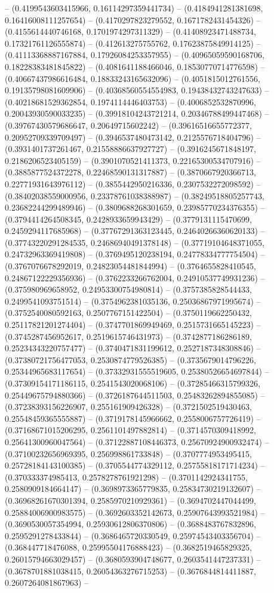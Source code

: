 -- (0.4199543603415966, 0.16114297359441734) -- (0.4184941281381698, 0.16416008111257654) -- (0.4170297823279552, 0.1671782431454326) -- (0.4155614440746168, 0.1701974297311329) -- (0.41408923471488734, 0.17321761126555874) -- (0.412613275755762, 0.17623875849914125) -- (0.41113368887167884, 0.17926084253357955) -- (0.40965059590168706, 0.18228383481845822) -- (0.4081641188466046, 0.18530770714776598) -- (0.40667437986616484, 0.18833243165632096) -- (0.4051815012761556, 0.19135798081609906) -- (0.40368560554554983, 0.19438432743247633) -- (0.40218681529362854, 0.1974114446403753) -- (0.4006852532870996, 0.20043930590033235) -- (0.39918104243721214, 0.20346788499447468) -- (0.39767430579686647, 0.20649715602242) -- (0.39616516655772377, 0.20952709339709497) -- (0.3946537480473142, 0.2125576718404796) -- (0.3931401737261467, 0.21558886637927727) -- (0.3916245671848197, 0.2186206523405159) -- (0.3901070521411373, 0.22165300534707916) -- (0.3885877524372278, 0.22468590131317887) -- (0.3870667920366713, 0.22771931643976112) -- (0.3855442950216336, 0.2307532272098592) -- (0.38402038559000956, 0.23378761038388987) -- (0.38249518805257743, 0.23682244299489946) -- (0.3809688268301659, 0.23985770234376355) -- (0.3794414264508345, 0.2428933659943429) -- (0.3779131115470699, 0.2459294117685968) -- (0.37767291363123445, 0.24640266360620133) -- (0.37743220291284535, 0.24686940491378148) -- (0.37719104648371055, 0.24732963369419808) -- (0.3769495120238194, 0.24778334777754504) -- (0.3767076678292019, 0.24823054481844994) -- (0.3764655828410545, 0.24867122229356936) -- (0.3762233266762004, 0.24910537749931236) -- (0.375980969658952, 0.24953300754980814) -- (0.3757385828544433, 0.2499541093751514) -- (0.3754962381035136, 0.25036867971995674) -- (0.3752540080592163, 0.2507767151422504) -- (0.3750119662250432, 0.25117821201274404) -- (0.3747701869949469, 0.2515731665145223) -- (0.3745287456952617, 0.2519615746431973) -- (0.3742877186286189, 0.25234343220757477) -- (0.3740471831199612, 0.2527187348308846) -- (0.37380721756477053, 0.2530874779526385) -- (0.3735679014796226, 0.25344965683117654) -- (0.37332931555519605, 0.25380526654697844) -- (0.37309154171186115, 0.2541543020068106) -- (0.37285466315799326, 0.25449675794880366) -- (0.3726187644511503, 0.25483262894855085) -- (0.37238393156226907, 0.255161909426328) -- (0.3721502519430463, 0.25548459365555887) -- (0.3719178145966662, 0.2558006757726419) -- (0.37168671015206295, 0.2561101497882814) -- (0.3714570309418992, 0.25641300960047564) -- (0.37122887108446373, 0.25670924900932474) -- (0.37100232656969395, 0.256998861733848) -- (0.3707774953495415, 0.25728184143100385) -- (0.3705544774329112, 0.25755818171714234) -- (0.370333374985413, 0.2578278761921298) -- (0.3701142924341755, 0.2580909184664147) -- (0.3698973365779835, 0.25834730219132607) -- (0.36968261670301394, 0.2585970210929361) -- (0.3694702447044499, 0.25884006900983575) -- (0.3692603352142673, 0.25907643993521984) -- (0.3690530057354994, 0.25930612806370806) -- (0.3688483767832896, 0.2595291278433844) -- (0.3686465720330549, 0.25974543403356704) -- (0.368447718476088, 0.25995504176888423) -- (0.3682519465829325, 0.26015794663029457) -- (0.3680593904748677, 0.2603541447237331) -- (0.3678701881038415, 0.26054363276715253) -- (0.3676844814411887, 0.2607264081867963) -- 
